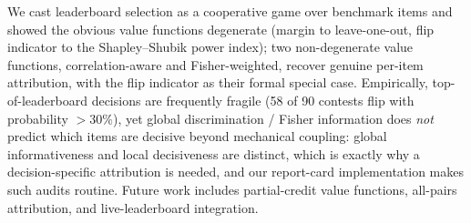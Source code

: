 \documentclass[conference]{IEEEtran}
\begin{document}
We cast leaderboard selection as a cooperative game over benchmark items and showed the obvious value functions degenerate (margin to leave-one-out, flip indicator to the Shapley--Shubik power index); two non-degenerate value functions, correlation-aware and Fisher-weighted, recover genuine per-item attribution, with the flip indicator as their formal special case.
Empirically, top-of-leaderboard decisions are frequently fragile (58 of 90 contests flip with probability $>30\%$), yet global discrimination / Fisher information does \emph{not} predict which items are decisive beyond mechanical coupling: global informativeness and local decisiveness are distinct, which is exactly why a decision-specific attribution is needed, and our report-card implementation makes such audits routine.
Future work includes partial-credit value functions, all-pairs attribution, and live-leaderboard integration.


\end{document}
